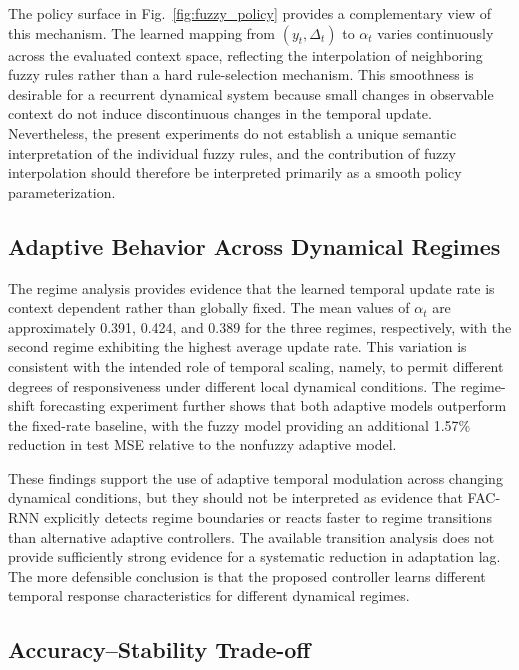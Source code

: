 \documentclass[journal]{IEEEtran}
\begin{document}
	The policy surface in Fig.~\ref{fig:fuzzy_policy} provides a complementary view of this mechanism. The learned mapping from $(y_t,\Delta_t)$ to $\alpha_t$ varies continuously across the evaluated context space, reflecting the interpolation of neighboring fuzzy rules rather than a hard rule-selection mechanism. This smoothness is desirable for a recurrent dynamical system because small changes in observable context do not induce discontinuous changes in the temporal update. Nevertheless, the present experiments do not establish a unique semantic interpretation of the individual fuzzy rules, and the contribution of fuzzy interpolation should therefore be interpreted primarily as a smooth policy parameterization.
	
	\subsection{Adaptive Behavior Across Dynamical Regimes}
	\label{subsec:regime_behavior}
	
	The regime analysis provides evidence that the learned temporal update rate is context dependent rather than globally fixed. The mean values of $\alpha_t$ are approximately 0.391, 0.424, and 0.389 for the three regimes, respectively, with the second regime exhibiting the highest average update rate. This variation is consistent with the intended role of temporal scaling, namely, to permit different degrees of responsiveness under different local dynamical conditions. The regime-shift forecasting experiment further shows that both adaptive models outperform the fixed-rate baseline, with the fuzzy model providing an additional 1.57\% reduction in test MSE relative to the nonfuzzy adaptive model.
	
	These findings support the use of adaptive temporal modulation across changing dynamical conditions, but they should not be interpreted as evidence that FAC-RNN explicitly detects regime boundaries or reacts faster to regime transitions than alternative adaptive controllers. The available transition analysis does not provide sufficiently strong evidence for a systematic reduction in adaptation lag. The more defensible conclusion is that the proposed controller learns different temporal response characteristics for different dynamical regimes.
	
	\subsection{Accuracy--Stability Trade-off}
	\label{subsec:tradeoff_discussion}
	
\end{document}
